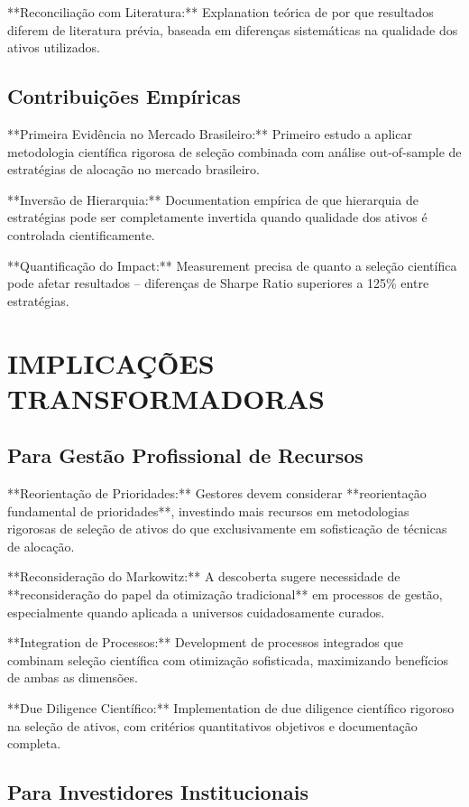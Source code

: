**Reconciliação com Literatura:** Explanation teórica de por que resultados diferem de literatura prévia, baseada em diferenças sistemáticas na qualidade dos ativos utilizados.

\subsection{Contribuições Empíricas}

**Primeira Evidência no Mercado Brasileiro:** Primeiro estudo a aplicar metodologia científica rigorosa de seleção combinada com análise out-of-sample de estratégias de alocação no mercado brasileiro.

**Inversão de Hierarquia:** Documentation empírica de que hierarquia de estratégias pode ser completamente invertida quando qualidade dos ativos é controlada cientificamente.

**Quantificação do Impact:** Measurement precisa de quanto a seleção científica pode afetar resultados – diferenças de Sharpe Ratio superiores a 125\% entre estratégias.

\section{IMPLICAÇÕES TRANSFORMADORAS}

\subsection{Para Gestão Profissional de Recursos}

**Reorientação de Prioridades:** Gestores devem considerar **reorientação fundamental de prioridades**, investindo mais recursos em metodologias rigorosas de seleção de ativos do que exclusivamente em sofisticação de técnicas de alocação.

**Reconsideração do Markowitz:** A descoberta sugere necessidade de **reconsideração do papel da otimização tradicional** em processos de gestão, especialmente quando aplicada a universos cuidadosamente curados.

**Integration de Processos:** Development de processos integrados que combinam seleção científica com otimização sofisticada, maximizando benefícios de ambas as dimensões.

**Due Diligence Científico:** Implementation de due diligence científico rigoroso na seleção de ativos, com critérios quantitativos objetivos e documentação completa.

\subsection{Para Investidores Institucionais}

